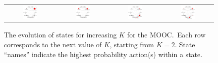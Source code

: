 {\begin{landscape}
\begin{figure}
\begin{tabular}{cccc}
    \includegraphics[width=0.30\textwidth]{figures/sustain-4state/state0.png}
    &
    \includegraphics[width=0.30\textwidth]{figures/sustain-4state/state3.png}
    &
    \includegraphics[width=0.30\textwidth]{figures/sustain-4state/state1.png}
    &
    \includegraphics[width=0.30\textwidth]{figures/sustain-4state/state2.png}
  \end{tabular}
  \caption{The evolution of states for increasing $K$ for the
  \protect\sustain{} MOOC.\ Each row corresponds to the next value of $K$,
  starting from $K=2$. State ``names'' indicate the highest
  probability action(s) within a state.} %
  \label{fig:sustain-state-evolution}
\end{figure}
\end{landscape}
}

